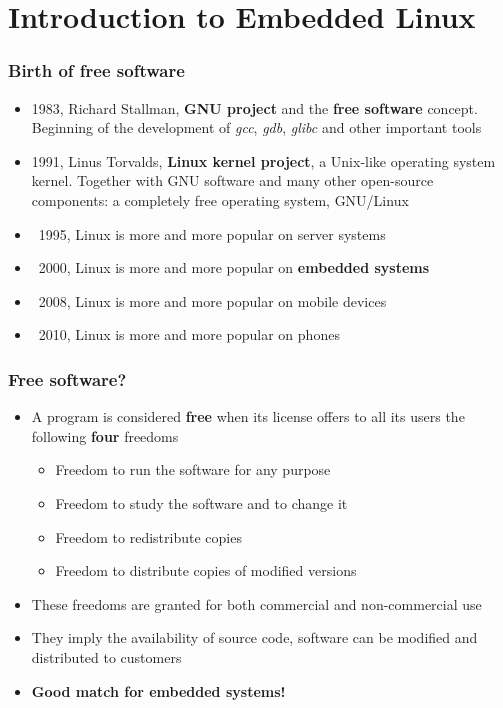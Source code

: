 \section{Introduction to Embedded Linux}

\begin{frame}
  \frametitle{Birth of free software}
  \begin{itemize}
  \item 1983, Richard Stallman, {\bf GNU project} and the {\bf free
      software} concept.  Beginning of the development of {\em gcc},
    {\em gdb}, {\em glibc} and other important tools
  \item 1991, Linus Torvalds, {\bf Linux kernel project}, a Unix-like
    operating system kernel. Together with GNU software and many other
    open-source components: a completely free operating system,
    GNU/Linux
  \item ~1995, Linux is more and more popular on server systems
  \item ~2000, Linux is more and more popular on {\bf embedded
      systems}
  \item ~2008, Linux is more and more popular on mobile devices
  \item ~2010, Linux is more and more popular on phones
  \end{itemize}
\end{frame}

\begin{frame}
  \frametitle{Free software?}
  \begin{itemize}
  \item A program is considered {\bf free} when its license offers to
    all its users the following {\bf four} freedoms
    \begin{itemize}
    \item Freedom to run the software for any purpose
    \item Freedom to study the software and to change it
    \item Freedom to redistribute copies
    \item Freedom to distribute copies of modified versions
    \end{itemize}
  \item These freedoms are granted for both commercial and
    non-commercial use
  \item They imply the availability of source code, software can be
    modified and distributed to customers
  \item {\bf Good match for embedded systems!}
  \end{itemize}
\end{frame}

